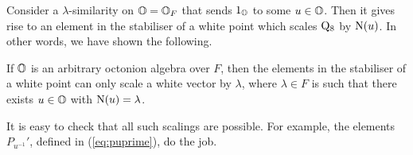 Consider a $\lambda$-similarity on $\mathbb{O} = \mathbb{O}_F$ that sends $1_{\mathbb{O}}$ to some $u \in \mathbb{O}$. 
Then it gives rise to an element in the stabiliser of a white point which scales $\mathord{\mathrm{Q}}_8$ by
$\mathord{\mathrm{N}}(u)$. In other words, we have shown the following.

\begin{proposition}
	If $\mathbb{O}$ is an arbitrary octonion algebra over $F$, then the elements in the stabiliser
	of a white point can only scale a white vector by $\lambda$, where $\lambda \in F$ is
	such that there exists $u \in \mathbb{O}$ with $\mathord{\mathrm{N}}(u) = \lambda$.  
\end{proposition}

It is easy to check that all such scalings are possible. For example, the elements 
$P_{u^{-1}}'$, defined in (\ref{eq:puprime}), do the job. 
